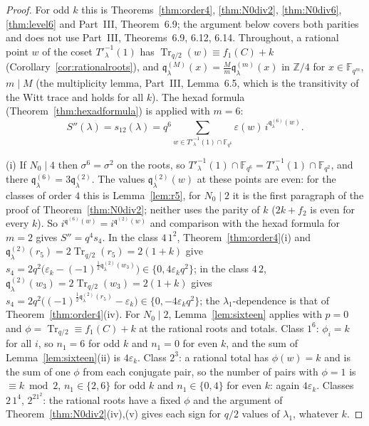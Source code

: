 \documentclass[12pt,a4paper]{amsart}
\theoremstyle{definition}
\newcommand{\F}{\mathbb{F}}
\newcommand{\Z}{\mathbb{Z}}
\newcommand{\Tr}{\operatorname{Tr}}
\newcommand{\eps}{\varepsilon}
\newcommand{\qq}{\mathfrak{q}}
\newcommand{\Spp}{S''}
\begin{document}
\begin{proof}
For odd $k$ this is Theorems~\ref{thm:order4}, \ref{thm:N0div2}, \ref{thm:N0div6}, \ref{thm:level6} and Part~III, Theorem~6.9; the argument below covers both parities and does not use Part~III, Theorems~6.9, 6.12, 6.14. Throughout, a rational point $w$ of the coset $T'^{-1}_\lambda(1)$ has $\Tr_{q/2}(w)\equiv f_1(C)+k$ (Corollary~\ref{cor:rationalroots}), and $\qq^{(M)}_\lambda(x)=\frac Mm\qq^{(m)}_\lambda(x)$ in $\Z/4$ for $x\in\F_{q^m}$, $m\mid M$ (the multiplicity lemma, Part~III, Lemma~6.5, which is the transitivity of the Witt trace and holds for all $k$). The hexad formula (Theorem~\ref{thm:hexadformula}) is applied with $m=6$:
\[
\Spp(\lambda)=s_{12}(\lambda)=q^6\sum_{w\in T'^{-1}_\lambda(1)\cap\F_{q^6}}\eps(w)\,i^{\qq^{(6)}_\lambda(w)} .
\]

(i) If $N_0\mid4$ then $\sigma^6=\sigma^2$ on the roots, so $T'^{-1}_\lambda(1)\cap\F_{q^6}=T'^{-1}_\lambda(1)\cap\F_{q^2}$, and there $\qq^{(6)}_\lambda=3\qq^{(2)}_\lambda$. The values $\qq^{(2)}_\lambda(w)$ at these points are even: for the classes of order $4$ this is Lemma~\ref{lem:r5}, for $N_0\mid2$ it is the first paragraph of the proof of Theorem~\ref{thm:N0div2}; neither uses the parity of $k$ ($2k+f_2$ is even for every $k$). So $i^{\qq^{(6)}(w)}=i^{\qq^{(2)}(w)}$ and comparison with the hexad formula for $m=2$ gives $\Spp=q^4s_4$. In the class $4\,1^2$, Theorem~\ref{thm:order4}(i) and $\qq^{(2)}_\lambda(r_5)=2\Tr_{q/2}(r_5)=2(1+k)$ give $s_4=2q^2\bigl(\eps_k-(-1)^{\frac12\qq^{(2)}_\lambda(w_3)}\bigr)\in\{0,4\eps_kq^2\}$; in the class $4\,2$, $\qq^{(2)}_\lambda(w_3)=2\Tr_{q/2}(w_3)=2(1+k)$ gives $s_4=2q^2\bigl((-1)^{\frac12\qq^{(2)}_\lambda(r_5)}-\eps_k\bigr)\in\{0,-4\eps_kq^2\}$; the $\lambda_1$-dependence is that of Theorem~\ref{thm:order4}(iv). For $N_0\mid2$, Lemma~\ref{lem:sixteen} applies with $p=0$ and $\phi=\Tr_{q/2}\equiv f_1(C)+k$ at the rational roots and totals. Class $1^6$: $\phi_i=k$ for all $i$, so $n_1=6$ for odd $k$ and $n_1=0$ for even $k$, and the sum of Lemma~\ref{lem:sixteen}(ii) is $4\eps_k$. Class $2^3$: a rational total has $\phi(w)=k$ and is the sum of one $\phi$ from each conjugate pair, so the number of pairs with $\phi=1$ is $\equiv k\bmod2$, $n_1\in\{2,6\}$ for odd $k$ and $n_1\in\{0,4\}$ for even $k$: again $4\eps_k$. Classes $2\,1^4$, $2^21^2$: the rational roots have a fixed $\phi$ and the argument of Theorem~\ref{thm:N0div2}(iv),(v) gives each sign for $q/2$ values of $\lambda_1$, whatever $k$.


\end{proof}
\end{document}

